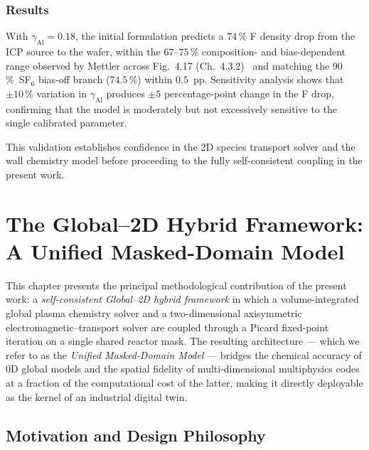 \documentclass[11pt,a4paper]{report}
\begin{document}
\subsection{Results}

With $\gamma_\mathrm{Al} = 0.18$, the initial formulation predicts a 74\,\% F density drop from the ICP source to the wafer, within the $67$--$75\,\%$ composition- and bias-dependent range observed by Mettler across Fig.~4.17 (Ch.~4.3.2)~\cite{Mettler2025} and matching the 90\,\%~SF$_6$ bias-off branch ($74.5\,\%$) within $0.5$~pp.  Sensitivity analysis shows that $\pm 10\,\%$ variation in $\gamma_\mathrm{Al}$ produces $\pm 5$ percentage-point change in the F drop, confirming that the model is moderately but not excessively sensitive to the single calibrated parameter.

This validation establishes confidence in the 2D species transport solver and the wall chemistry model before proceeding to the fully self-consistent coupling in the present work.


\newpage
\chapter{The Global--2D Hybrid Framework: A Unified Masked-Domain Model}
\label{ch:hybrid}

This chapter presents the principal methodological contribution of the present work: a \emph{self-consistent Global--2D hybrid framework} in which a volume-integrated global plasma chemistry solver and a two-dimensional axisymmetric electromagnetic--transport solver are coupled through a Picard fixed-point iteration on a single shared reactor mask.  The resulting architecture --- which we refer to as the \emph{Unified Masked-Domain Model} --- bridges the chemical accuracy of 0D global models and the spatial fidelity of multi-dimensional multiphysics codes at a fraction of the computational cost of the latter, making it directly deployable as the kernel of an industrial digital twin.

\section{Motivation and Design Philosophy}
\label{sec:hybrid-motivation}
\end{document}
